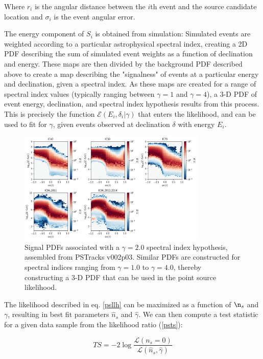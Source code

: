 Where $r_i$ is the angular distance between the $i$th event and the source candidate location and $\sigma_i$ is the event angular error.  

The energy component of $S_i$ is obtained from simulation: Simulated events are weighted according to a particular astrophysical spectral index, creating a 2D PDF describing the sum of simulated event weights as a function of declination and energy. These maps are then divided by the background PDF described above to create a map describing the "signalness" of events at a particular energy and declination, given a spectral index. As these maps are created for a range of spectral index values (typically ranging between $\gamma=1$ and $\gamma=4$), a 3-D PDF of event energy, declination, and spectral index hypothesis results from this process. This is precisely the function $\mathcal{E}(E_i, \delta_i|\gamma)$ that enters the likelihood, and can be used to fit for $\gamma$, given events observed at declination $\delta$ with energy $E_i$.  

\begin{figure}[h]
\centering
\includegraphics[width=0.8\textwidth]{figs/sig_hists.png}
\caption{Signal PDFs associated with a $\gamma=2.0$ spectral index hypothesis, assembled from PSTracks v002p03. Similar PDFs are constructed for spectral indices ranging from $\gamma=1.0$ to $\gamma=4.0$, thereby constructing a 3-D PDF that can be used in the point source likelihood.}
\label{fig:SigPDf}
\end{figure}

The likelihood described in eq. \ref{psllh} can be maximized as a function of $\n_s$ and $\gamma$, resulting in best fit parameters $\hat{n}_s$ and $\hat{\gamma}$. We can then compute a test statistic for a given data sample from the likelihood ratio (\ref{psts}):

\begin{equation}
    TS = -2 \log \frac{\mathcal{L}(n_s=0)}{\mathcal{L}(\hat{n}_s, \hat{\gamma})}
    \label{psts}
\end{equation}

